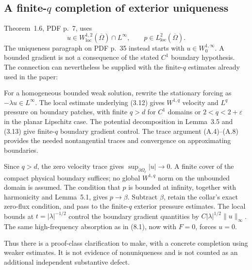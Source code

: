 \documentclass[10pt]{article}
\begin{document}
\subsection*{A finite-\(q\) completion of exterior uniqueness}
Theorem 1.6, PDF p. 7, uses \[u\in W^{1,2}_{\mathrm{loc}}(\overline\Omega)\cap L^\infty,
 \qquad p\in L^2_{\mathrm{loc}}(\overline\Omega).\] The uniqueness paragraph on PDF p. 35 instead starts with \(u\in W^{1,\infty}_0\). A bounded gradient is not a consequence of the stated \(C^1\) boundary hypothesis. The connection can nevertheless be supplied with the finite-\(q\) estimates already used in the paper:\par
For a homogeneous bounded weak solution, rewrite the stationary forcing as \(-\lambda u\in L^\infty\). The local estimate underlying (3.12) gives \(W^{1,q}\) velocity and \(L^q\) pressure on boundary patches, with finite \(q>d\) for \(C^1\) domains or \(2<q<2+\varepsilon\) in the planar Lipschitz case. The potential decomposition in Lemma 3.5 and (3.13) give finite-\(q\) boundary gradient control. The trace argument (A.4)–(A.8) provides the needed nontangential traces and convergence on approximating boundaries.\par
Since \(q>d\), the zero velocity trace gives \(\sup_{\partial\Omega_\ell}|u|\to0\). A finite cover of the compact physical boundary suffices; no global \(W^{1,q}\) norm on the unbounded domain is assumed. The condition that \(p\) is bounded at infinity, together with harmonicity and Lemma 5.1, gives \(p\to\beta\). Subtract \(\beta\), retain the collar’s exact zero-flux condition, and pass to the finite-\(q\) exterior pressure estimates. The local bounds at \(t=|\lambda|^{-1/2}\) control the boundary gradient quantities by \(C|\lambda|^{1/2}\|u\|_\infty\). The same high-frequency absorption as in (8.1), now with \(F=0\), forces \(u=0\).\par
Thus there is a proof-class clarification to make, with a concrete completion using weaker estimates. It is not evidence of nonuniqueness and is not counted as an additional independent substantive defect.\par
\end{document}
